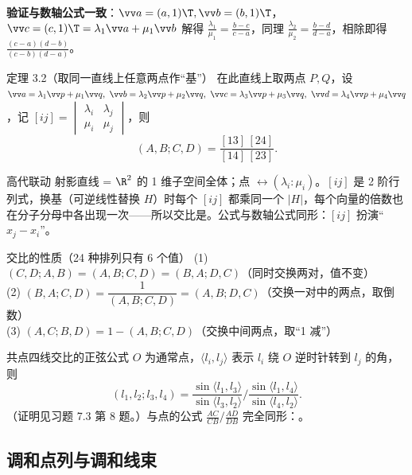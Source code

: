 \noindent\textbf{验证与数轴公式一致}：$\vv a=(a,1)\T,\vv b=(b,1)\T$，$\vv c=(c,1)\T=\lambda_1\vv a+\mu_1\vv b$ 解得 $\frac{\lambda_1}{\mu_1}=\frac{b-c}{c-a}$，同理 $\frac{\lambda_2}{\mu_2}=\frac{b-d}{d-a}$，相除即得 $\frac{(c-a)(d-b)}{(c-b)(d-a)}$。

\begin{thmbox}{定理 3.2（取同一直线上任意两点作“基”）}
在此直线上取两点 $P,Q$，设 $\vv a=\lambda_1\vv p+\mu_1\vv q,\ \vv b=\lambda_2\vv p+\mu_2\vv q,\ \vv c=\lambda_3\vv p+\mu_3\vv q,\ \vv d=\lambda_4\vv p+\mu_4\vv q$，记 $[ij]=\begin{vmatrix}\lambda_i&\lambda_j\\\mu_i&\mu_j\end{vmatrix}$，则
\begin{equation}
(A,B;C,D)=\frac{[13]\,[24]}{[14]\,[23]} .
\end{equation}
\end{thmbox}

\begin{gdbox}{高代联动}
射影直线 = $\R^2$ 的 1 维子空间全体；点 $\leftrightarrow (\lambda_i:\mu_i)$。$[ij]$ 是 2 阶行列式，换基（可逆线性替换 $H$）时每个 $[ij]$ 都乘同一个 $|H|$，每个向量的倍数也在分子分母中各出现一次——所以交比是。公式与数轴公式同形：$[ij]$ 扮演“$x_j-x_i$”。
\end{gdbox}

\begin{thmbox}{交比的性质（24 种排列只有 6 个值）}
(1) $(C,D;A,B)=(A,B;C,D)=(B,A;D,C)$\quad（同时交换两对，值不变）\\
(2) $(B,A;C,D)=\dfrac{1}{(A,B;C,D)}=(A,B;D,C)$\quad（交换一对中的两点，取倒数）\\
(3) $(A,C;B,D)=1-(A,B;C,D)$\quad（交换中间两点，取“1 减”）
\end{thmbox}

\begin{thmbox}{共点四线交比的正弦公式}
$O$ 为通常点，$\langle l_i,l_j\rangle$ 表示 $l_i$ 绕 $O$ 逆时针转到 $l_j$ 的角，则
\begin{equation}
(l_1,l_2;l_3,l_4)=\frac{\sin\langle l_1,l_3\rangle}{\sin\langle l_3,l_2\rangle}\Big/\frac{\sin\langle l_1,l_4\rangle}{\sin\langle l_4,l_2\rangle}.
\end{equation}
（证明见习题 7.3 第 8 题。）与点的公式 $\frac{AC}{CB}\big/\frac{AD}{DB}$ 完全同形：。
\end{thmbox}

\subsection{调和点列与调和线束}

